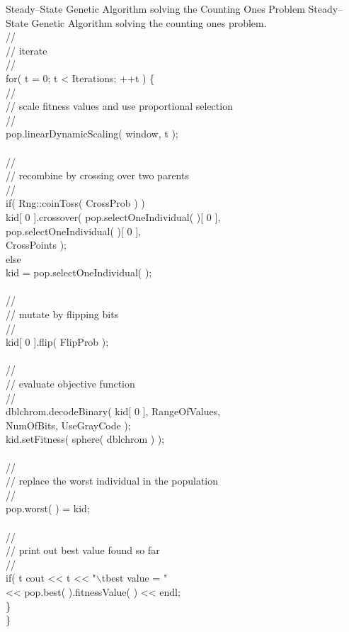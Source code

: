 \begin{programlisting}{Steady--State Genetic Algorithm solving the Counting Ones Problem}{
    Steady--State Genetic Algorithm solving the counting ones problem.}
\\
    //\\
    // iterate\\
    //\\
    for( t = 0; t < Iterations; ++t ) \{\\
        //\\
        // scale fitness values and use proportional selection\\
        //\\
        pop.linearDynamicScaling( window, t );\\
\\
        //\\
        // recombine by crossing over two parents\\
        //\\
        if( Rng::coinToss( CrossProb ) )\\
            kid[ 0 ].crossover( pop.selectOneIndividual( )[ 0 ],\\
                                pop.selectOneIndividual( )[ 0 ],\\
                                CrossPoints );\\
        else\\
            kid = pop.selectOneIndividual( );\\
\\
        //\\
        // mutate by flipping bits\\
        //\\
        kid[ 0 ].flip( FlipProb );\\
\\
        //\\
        // evaluate objective function\\
        //\\
        dblchrom.decodeBinary( kid[ 0 ], RangeOfValues,\\
                               NumOfBits, UseGrayCode );\\
        kid.setFitness( sphere( dblchrom ) );\\
\\
        //\\
        // replace the worst individual in the population\\
        //\\
        pop.worst( ) = kid;\\
\\
        //\\
        // print out best value found so far\\
        //\\
        if( t %
            cout << t << "$\backslash$tbest value = "\\
                 << pop.best( ).fitnessValue( ) << endl;\\
    \}\\
\}\\
\end{programlisting}

